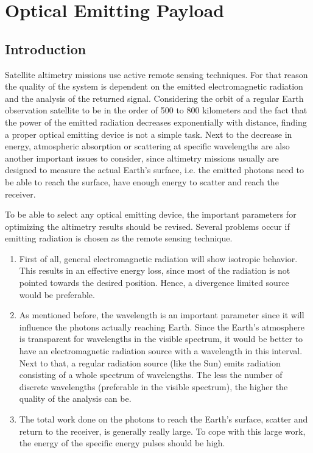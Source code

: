 \section{Optical Emitting Payload}
	\label{blDOLSR}
		\subsection{Introduction}
Satellite altimetry missions use active remote sensing techniques. For that reason the quality of the system is dependent on the emitted electromagnetic radiation and the analysis of the returned signal. Considering the orbit of a regular Earth observation satellite to be in the order of 500 to 800 kilometers and the fact that the power of the emitted radiation decreases exponentially with distance, finding a proper optical emitting device is not a simple task. Next to the decrease in energy, atmospheric absorption or scattering at specific wavelengths are also another important issues to consider, since altimetry missions usually are designed to measure the actual Earth's surface, i.e. the emitted photons need to be able to reach the surface, have enough energy to scatter and reach the receiver.

To be able to select any optical emitting device, the important parameters for optimizing the altimetry results should be revised. Several problems occur if emitting radiation is chosen as the remote sensing technique. 
\begin{enumerate}[i]
	\item First of all, general electromagnetic radiation will show isotropic behavior. This results in an effective energy loss, since most of the radiation is not pointed towards the desired position. Hence, a divergence limited source would be preferable.
	\item As mentioned before, the wavelength is an important parameter since it will influence the photons actually reaching Earth. Since the Earth's atmosphere is transparent for wavelengths in the visible spectrum, it would be better to have an electromagnetic radiation source with a wavelength in this interval. Next to that, a regular radiation source (like the Sun) emits radiation consisting of a whole spectrum of wavelengths. The less the number of discrete wavelengths (preferable in the visible spectrum), the higher the quality of the analysis can be.
	\item The total work done on the photons to reach the Earth's surface, scatter and return to the receiver, is generally really large. To cope with this large work, the energy of the specific energy pulses should be high.  
\end{enumerate}

